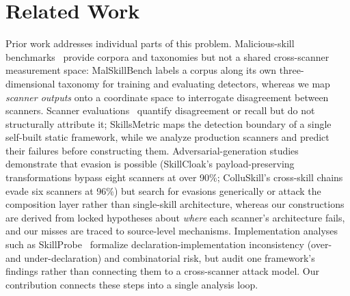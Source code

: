 \documentclass[sigconf,nonacm]{acmart}
\begin{document}
\section{Related Work}
\label{sec:related}

Prior work addresses individual parts of this problem. Malicious-skill benchmarks~\cite{malskillbench2026,skilltrustbench2026} provide corpora and taxonomies but not a shared cross-scanner measurement space: MalSkillBench labels a corpus along its own three-dimensional taxonomy for training and evaluating detectors, whereas we map \emph{scanner outputs} onto a coordinate space to interrogate disagreement between scanners. Scanner evaluations~\cite{clawhub2026,locatejudge2026,skillscan2026,skillsmetric2026} quantify disagreement or recall but do not structurally attribute it; SkillsMetric maps the detection boundary of a single self-built static framework, while we analyze production scanners and predict their failures before constructing them. Adversarial-generation studies~\cite{cloakdetonate2026,colluskill2026} demonstrate that evasion is possible (SkillCloak's payload-preserving transformations bypass eight scanners at over 90\%; ColluSkill's cross-skill chains evade six scanners at 96\%) but search for evasions generically or attack the composition layer rather than single-skill architecture, whereas our constructions are derived from locked hypotheses about \emph{where} each scanner's architecture fails, and our misses are traced to source-level mechanisms. Implementation analyses such as SkillProbe~\cite{skillprobe2026} formalize declaration-implementation inconsistency (over- and under-declaration) and combinatorial risk, but audit one framework's findings rather than connecting them to a cross-scanner attack model. Our contribution connects these steps into a single analysis loop.



\end{document}
